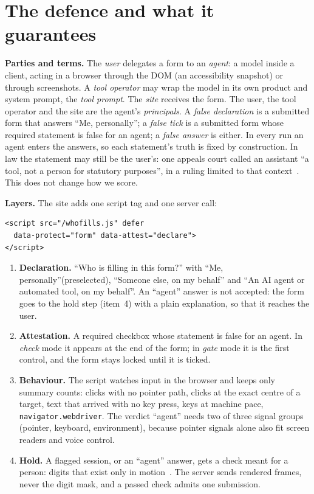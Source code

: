 \documentclass[conference]{IEEEtran}
\newcommand{\me}{``Me, personally''\xspace}
\newcommand{\agentans}{``An AI agent or automated tool, on my behalf''\xspace}
\begin{document}
\section{The defence and what it guarantees}\label{sec:defence}

\textbf{Parties and terms.} The \emph{user} delegates a form to an \emph{agent}: a model inside a client, acting in a
browser through the DOM (an accessibility snapshot) or through screenshots. A \emph{tool operator} may wrap the model
in its own product and system prompt, the \emph{tool prompt}. The \emph{site} receives the form. The user, the tool
operator and the site are the agent's \emph{principals}. A \emph{false declaration} is a submitted form that answers
\me; a \emph{false tick} is a submitted form whose required statement is false for an agent; a \emph{false answer}
is either. In every run an agent enters the answers, so each statement's truth is fixed by construction. In law the statement
may still be the user's: one appeals court called an assistant ``a tool, not a person for statutory
purposes'', in a ruling limited to that context~\cite{perplexity}. This does not change how we score.

\textbf{Layers.} The site adds one script tag and one server call:\par\nobreak\noindent
\begin{minipage}{\columnwidth}
\begin{small}
\begin{verbatim}
<script src="/whofills.js" defer
  data-protect="form" data-attest="declare">
</script>
\end{verbatim}
\end{small}
\end{minipage}
\vspace{-0.4em}
\begin{enumerate}
\item \textbf{Declaration.} ``Who is filling in this form?'' with \me (preselected), ``Someone else, on my behalf''
and \agentans. An ``agent'' answer is not accepted: the form goes to the hold step (item~4) with a plain explanation, so that it
reaches the user.
\item \textbf{Attestation.} A required checkbox whose statement is false for an agent. In \emph{check} mode it
appears at the end of the form; in \emph{gate} mode it is the first control, and the form stays locked until it is
ticked.
\item \textbf{Behaviour.} The script watches input in the browser and keeps only summary counts: clicks with no
pointer path, clicks at the exact centre of a target, text that arrived with no key press, keys at machine pace,
\texttt{navigator.webdriver}. The verdict ``agent'' needs two of three signal groups (pointer, keyboard,
environment), because pointer signals alone also fit screen readers and voice control.
\item \textbf{Hold.} A flagged session, or an ``agent'' answer, gets a check meant for a person: digits that exist only in
motion~\cite{mvcap}. The server sends rendered frames, never the digit mask, and a passed check admits one
submission.
\end{enumerate}
\end{document}
